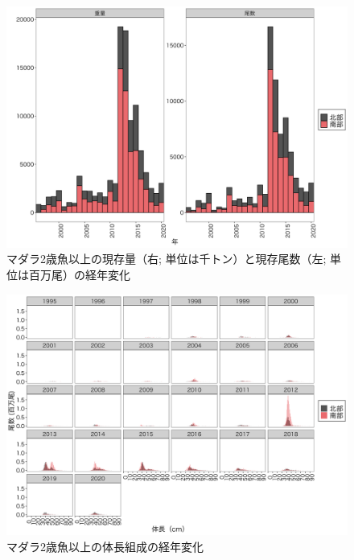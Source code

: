 \documentclass[11pt]{article} %
\begin{document}
\begin{linenumbers}
\begin{figure}[h]
  \centering
  \includegraphics[width = 14cm]{マダラ２＋trend.png}
  \caption{マダラ2歳魚以上の現存量（右; 単位は千トン）と現存尾数（左; 単位は百万尾）の経年変化}
\end{figure}

\begin{figure}[h]
  \centering
  \includegraphics[width = 14cm]{マダラ2+length.png}
  \caption{マダラ2歳魚以上の体長組成の経年変化}
\end{figure}


\end{linenumbers}
\end{document}
